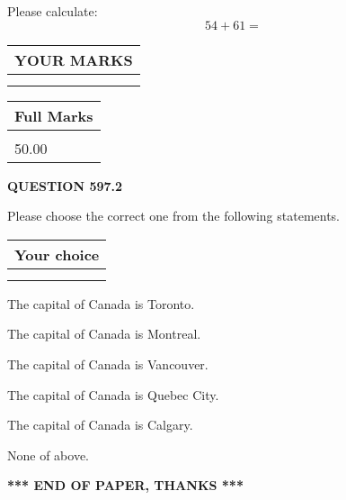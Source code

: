 \documentclass[12pt]{article}
\begin{document}
  
 
Please calculate:
\begin{equation}
54 +  %
61 = \nonumber
\end{equation}
 

 

 
  
\vspace{0.2in}
  
\noindent\begin{tabular}{|l|}
\hline
 YOUR MARKS  \\
\hline
 \\ 
 \\ 
\hline
\end{tabular}
\hspace{0.05in} \begin{tabular}{|l|}
\hline
 Full Marks  \\
\hline
 \\ 
50.00 \\
\hline
\end{tabular}
{\textbf{\Large{QUESTION
597.2 
}}}
  
  
Please choose the correct one from the following statements.
  
  
\noindent\hspace{3.0in} \begin{tabular}{|l|}
\hline
Your choice \\
\hline
 \\ 
 \\ 
\hline
\end{tabular}
  
  
 
 
The capital of Canada is Toronto.
 
 
The capital of Canada is Montreal.
 
 
The capital of Canada is Vancouver.
 
 
The capital of Canada is Quebec City.
 
 
The capital of Canada is Calgary.
 
 
 None of above.
 
 
   
   
 \vspace{0.2in}
 
   
   
   
   
\vspace{1.0in} 
{\textbf{\large{ *** END OF PAPER, THANKS *** }}} 
   
\end{document}
